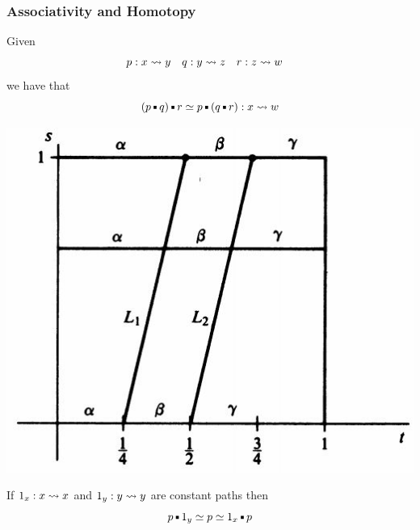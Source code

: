 \documentclass[handout]{beamer} %
\begin{document}

\begin{frame}
  \frametitle{Associativity and Homotopy}
  \small
  Given 
  \begin{align*}
    p &: x \rightsquigarrow y
    &
    q &: y \rightsquigarrow z
    &
    r &: z \rightsquigarrow w
  \end{align*}
  we have that
  \[
    (p \Concat q) \Concat r \simeq p \Concat (q \Concat r) : x \Path w
  \]

  \begin{center}
    \includegraphics[scale=0.3]{assoc.jpg}
  \end{center}
  
  If $1_x : x \rightsquigarrow x$ and $1_y : y \rightsquigarrow y$ are constant paths then
  \[
    p \Concat 1_y \simeq p \simeq 1_x \Concat p
  \]
\end{frame}
\end{document}

